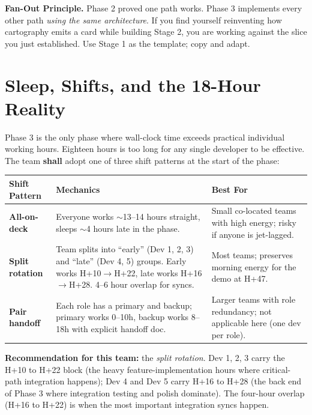 \documentclass[11pt,letterpaper]{article}
\newcommand{\shall}{\textbf{shall}}
\begin{document}
\begin{principle}
\textbf{Fan-Out Principle.} Phase 2 proved one path works. Phase 3 implements every other path \textit{using the same architecture}. If you find yourself reinventing how cartography emits a card while building Stage 2, you are working against the slice you just established. Use Stage 1 as the template; copy and adapt.
\end{principle}

\section{Sleep, Shifts, and the 18-Hour Reality}

Phase 3 is the only phase where wall-clock time exceeds practical individual working hours. Eighteen hours is too long for any single developer to be effective. The team \shall{} adopt one of three shift patterns at the start of the phase:

\begin{longtable}{|p{2.6cm}|p{5.5cm}|p{6.4cm}|}
\hline
\rowcolor{ibmblue!10}
\textbf{Shift Pattern} & \textbf{Mechanics} & \textbf{Best For} \\
\hline
\textbf{All-on-deck} & Everyone works ${\sim}$13--14 hours straight, sleeps ${\sim}$4 hours late in the phase. & Small co-located teams with high energy; risky if anyone is jet-lagged. \\
\hline
\textbf{Split rotation} & Team splits into ``early'' (Dev 1, 2, 3) and ``late'' (Dev 4, 5) groups. Early works H+10$\rightarrow$H+22, late works H+16$\rightarrow$H+28. 4--6 hour overlap for syncs. & Most teams; preserves morning energy for the demo at H+47. \\
\hline
\textbf{Pair handoff} & Each role has a primary and backup; primary works 0--10h, backup works 8--18h with explicit handoff doc. & Larger teams with role redundancy; not applicable here (one dev per role). \\
\hline
\end{longtable}

\textbf{Recommendation for this team:} the \textit{split rotation}. Dev 1, 2, 3 carry the H+10 to H+22 block (the heavy feature-implementation hours where critical-path integration happens); Dev 4 and Dev 5 carry H+16 to H+28 (the back end of Phase 3 where integration testing and polish dominate). The four-hour overlap (H+16 to H+22) is when the most important integration syncs happen.
\end{document}
